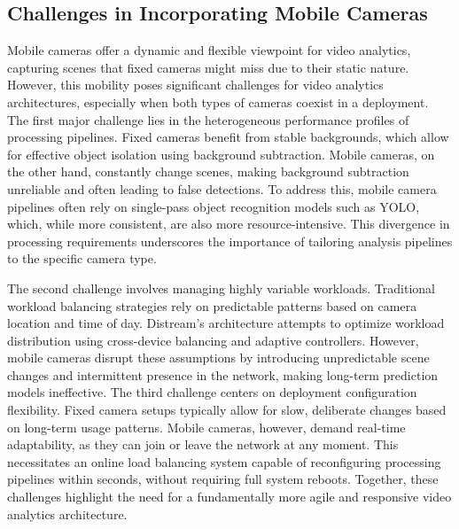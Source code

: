 \subsection{Challenges in Incorporating Mobile Cameras}

Mobile cameras offer a dynamic and flexible viewpoint for video analytics, capturing scenes that fixed cameras might miss due to their static nature. However, this mobility poses significant challenges for video analytics architectures, especially when both types of cameras coexist in a deployment. The first major challenge lies in the heterogeneous performance profiles of processing pipelines. Fixed cameras benefit from stable backgrounds, which allow for effective object isolation using background subtraction. Mobile cameras, on the other hand, constantly change scenes, making background subtraction unreliable and often leading to false detections. To address this, mobile camera pipelines often rely on single-pass object recognition models such as YOLO, which, while more consistent, are also more resource-intensive. This divergence in processing requirements underscores the importance of tailoring analysis pipelines to the specific camera type.

The second challenge involves managing highly variable workloads. Traditional workload balancing strategies rely on predictable patterns based on camera location and time of day. Distream's architecture attempts to optimize workload distribution using cross-device balancing and adaptive controllers. However, mobile cameras disrupt these assumptions by introducing unpredictable scene changes and intermittent presence in the network, making long-term prediction models ineffective. The third challenge centers on deployment configuration flexibility. Fixed camera setups typically allow for slow, deliberate changes based on long-term usage patterns. Mobile cameras, however, demand real-time adaptability, as they can join or leave the network at any moment. This necessitates an online load balancing system capable of reconfiguring processing pipelines within seconds, without requiring full system reboots. Together, these challenges highlight the need for a fundamentally more agile and responsive video analytics architecture.

